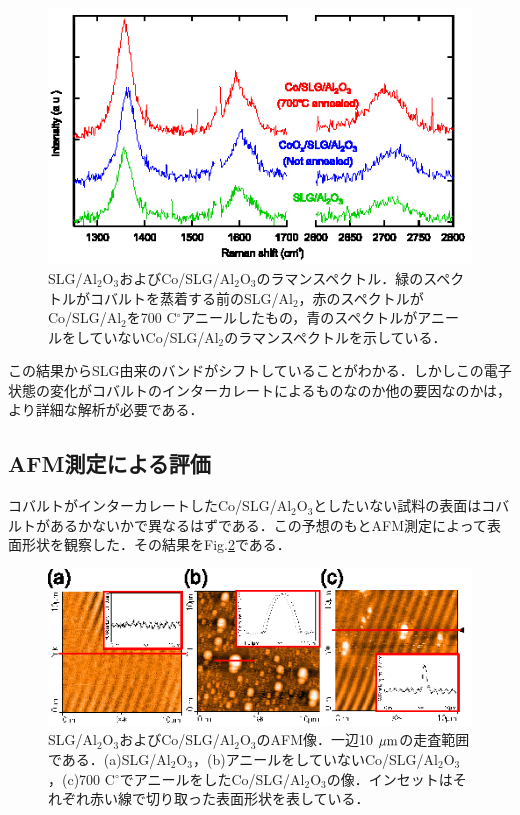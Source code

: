{\begin{figure}[htbp]
\centerline{
\includegraphics[width=12cm]{images/raman_comparison.eps}
}
\caption{SLG/Al$_{2}$O$_{3}$およびCo/SLG/Al$_{2}$O$_{3}$のラマンスペクトル．緑のスペクトルがコバルトを蒸着する前のSLG/Al$_{2}$，赤のスペクトルがCo/SLG/Al$_{2}$を700 C$^{\circ}$アニールしたもの，青のスペクトルがアニールをしていないCo/SLG/Al$_{2}$のラマンスペクトルを示している．
}
\label{fig:raman_comparison} 
\end{figure}

この結果からSLG由来のバンドがシフトしていることがわかる．しかしこの電子状態の変化がコバルトのインターカレートによるものなのか他の要因なのかは，より詳細な解析が必要である．


\subsection{AFM測定による評価}
コバルトがインターカレートしたCo/SLG/Al$_{2}$O$_{3}$としたいない試料の表面はコバルトがあるかないかで異なるはずである．この予想のもとAFM測定によって表面形状を観察した．その結果をFig.\ref{fig:AFM_SLG}である．
\begin{figure}[htbp]
\centerline{
\includegraphics[width=12cm]{images/AFM_SLG.eps}
}
\caption{SLG/Al$_{2}$O$_{3}$およびCo/SLG/Al$_{2}$O$_{3}$のAFM像．一辺10 $\rm\mu m$の走査範囲である．(a)SLG/Al$_{2}$O$_{3}$，(b)アニールをしていないCo/SLG/Al$_{2}$O$_{3}$，(c)700 C$^{\circ}$でアニールをしたCo/SLG/Al$_{2}$O$_{3}$の像．インセットはそれぞれ赤い線で切り取った表面形状を表している．}
\label{fig:AFM_SLG} 
\end{figure}

}
